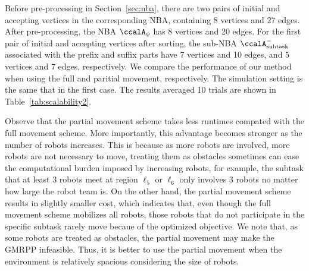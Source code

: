 \documentclass[Afour,sageh,times]{sagej}
\newcommand{\auto}[1]{\ccalA_{\textup{#1}}}
\newcommand{\autop}{\ccalA_{\phi}}
\begin{document}
{\begin{table}[!t]
  \caption{Results with respect to the number of robots}\label{tab:scalability2}
  \centering
\end{table}

Before pre-processing in Section~\ref{sec:nba}, there are two pairs of initial and accepting vertices in the corresponding NBA, containing 8 vertices and 27 edges. After pre-processing,  the NBA $\autop$  has 8 vertices and 20 edges. For the first pair of initial and accepting vertices after sorting, the sub-NBA $\auto{subtask}^-$ associated with  the prefix and suffix parts have 7 vertices and 10 edges, and 5 vertices and 7 edges, respectively. We compare the performance of our method when using the full and paritial movement, respectively. The simulation setting is the same that in the first case. The results averaged 10 trials are shown in Table~\ref{tab:scalability2}.

Observe that the partial movement scheme takes less runtimes  compated with the full movement scheme. More importantly, this advantage becomes stronger as the number of robots increases. This is because as more robots are involved, more robots are not necessary to move, treating them as obstacles sometimes can ease the computational burden imposed by increasing robots, for example, the subtask that at least 3 robots meet at region $\ell_5$ or $\ell_6$ only involves 3 robots no matter how large the robot team is. On the other hand, the partial movement scheme results in slightly smaller cost, which indicates that, even though the full movement scheme mobilizes all robots, those robots that do not participate in the specific subtask rarely move becaue of the optimized objective. We note that, as some robots are treated as obstacles,  the partial movement may make the GMRPP infeasible. Thus, it is better to use the partial movement when the environment is relatively spacious considering the size of robots.

}
\end{document}
